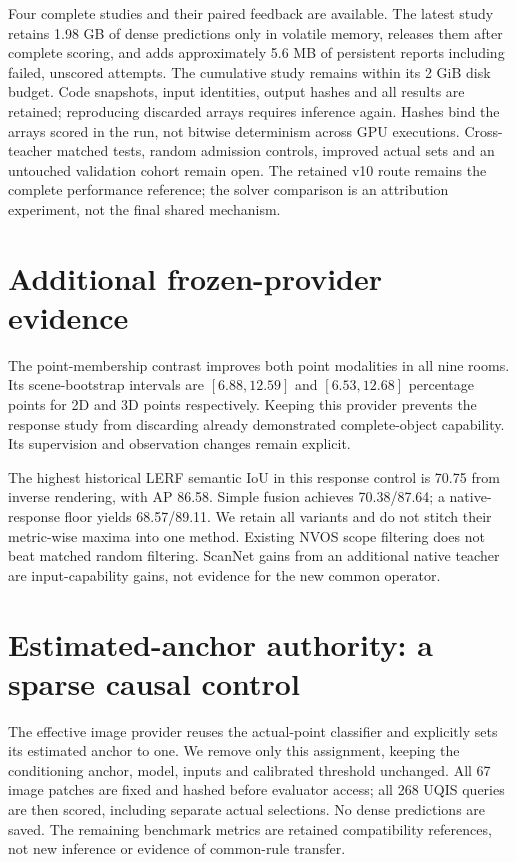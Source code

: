 \documentclass[10pt]{article}
\begin{document}
Four complete studies and their paired feedback are available. The latest
study retains 1.98 GB of dense predictions only in volatile memory, releases
them after complete scoring, and adds approximately 5.6 MB of persistent
reports including failed, unscored attempts. The cumulative study remains
within its 2 GiB disk budget. Code snapshots, input identities, output hashes
and all results are retained; reproducing discarded arrays requires inference
again. Hashes bind the arrays scored in the run, not bitwise determinism across
GPU executions. Cross-teacher matched tests, random admission controls, improved
actual sets and an untouched validation cohort remain open. The retained v10
route remains the complete performance reference; the solver comparison is
an attribution experiment, not the final shared mechanism.

\section{Additional frozen-provider evidence}
\begin{table}[ht]
\centering\small
\resizebox{\linewidth}{!}{}
\caption{Additional evidence for frozen providers. The ScanNet comparison uses
three rooms held out during that historical study. Point membership uses the
same learner with different observation distributions and counts, and inherits
labelled-room supervision. These are not gains of the new shared operator.}
\end{table}

The point-membership contrast improves both point modalities in all nine
rooms. Its scene-bootstrap intervals are $[6.88,12.59]$ and $[6.53,12.68]$
percentage points for 2D and 3D points respectively. Keeping this provider
prevents the response study from discarding already demonstrated complete-object
capability. Its supervision and observation changes remain explicit.

The highest historical LERF semantic IoU in this response control is 70.75
from inverse rendering, with AP 86.58. Simple fusion achieves 70.38/87.64;
a native-response floor yields 68.57/89.11. We retain all variants and do not
stitch their metric-wise maxima into one method. Existing NVOS scope filtering
does not beat matched random filtering. ScanNet gains from an additional native
teacher are input-capability gains, not evidence for the new common operator.

\section{Estimated-anchor authority: a sparse causal control}
The effective image provider reuses the actual-point classifier and explicitly
sets its estimated anchor to one. We remove only this assignment, keeping the
conditioning anchor, model, inputs and calibrated threshold unchanged. All 67
image patches are fixed and hashed before evaluator access; all 268 UQIS queries
are then scored, including separate actual selections. No dense predictions are
saved. The remaining benchmark metrics are retained compatibility references,
not new inference or evidence of common-rule transfer.
\end{document}
